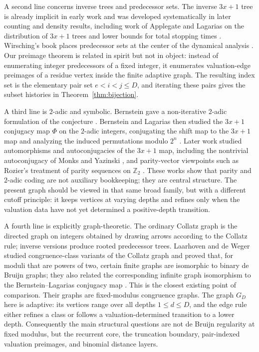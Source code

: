 \documentclass[11pt]{article}
\theoremstyle{definition}
\theoremstyle{remark}
\begin{document}
A second line concerns inverse trees and predecessor sets.  The inverse $3x+1$ tree is already implicit in early work and was developed systematically in later counting and density results, including work of Applegate and Lagarias on the distribution of $3x+1$ trees and lower bounds for total stopping times \cite{ApplegateLagarias1995,ApplegateLagarias2003}.  Wirsching's book places predecessor sets at the center of the dynamical analysis \cite{Wirsching1998}.  Our preimage theorem is related in spirit but not in object: instead of enumerating integer predecessors of a fixed integer, it enumerates valuation-edge preimages of a residue vertex inside the finite adaptive graph.  The resulting index set is the elementary pair set $e<i<j\le D$, and iterating these pairs gives the subset histories in Theorem~\ref{thm:bijection}.

A third line is $2$-adic and symbolic.  Bernstein gave a non-iterative $2$-adic formulation of the conjecture \cite{Bernstein1994}.  Bernstein and Lagarias then studied the $3x+1$ conjugacy map $\Phi$ on the $2$-adic integers, conjugating the shift map to the $3x+1$ map and analyzing the induced permutations modulo $2^n$ \cite{BernsteinLagarias1996}.  Later work studied automorphisms and autoconjugacies of the $3x+1$ map, including the nontrivial autoconjugacy of Monks and Yazinski \cite{MonksYazinski2004}, and parity-vector viewpoints such as Rozier's treatment of parity sequences on $\mathbb Z_2$ \cite{Rozier2019}.  These works show that parity and $2$-adic coding are not auxiliary bookkeeping; they are central structure.  The present graph should be viewed in that same broad family, but with a different cutoff principle: it keeps vertices at varying depths and refines only when the valuation data have not yet determined a positive-depth transition.

A fourth line is explicitly graph-theoretic.  The ordinary Collatz graph is the directed graph on integers obtained by drawing arrows according to the Collatz rule; inverse versions produce rooted predecessor trees.  Laarhoven and de Weger studied congruence-class variants of the Collatz graph and proved that, for moduli that are powers of two, certain finite graphs are isomorphic to binary de Bruijn graphs; they also related the corresponding infinite graph isomorphism to the Bernstein--Lagarias conjugacy map \cite{LaarhovenDeWeger2013}.  This is the closest existing point of comparison.  Their graphs are fixed-modulus congruence graphs.  The graph $G_D$ here is adaptive: its vertices range over all depths $1\le d\le D$, and the edge rule either refines a class or follows a valuation-determined transition to a lower depth.  Consequently the main structural questions are not de Bruijn regularity at fixed modulus, but the recurrent core, the truncation boundary, pair-indexed valuation preimages, and binomial distance layers.
\end{document}
